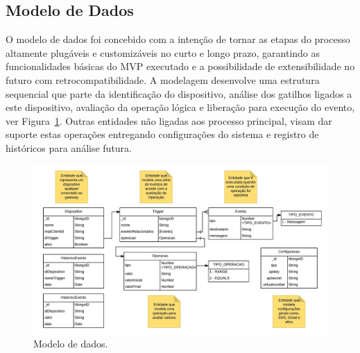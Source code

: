 \subsection{Modelo de Dados} 
O modelo de dados foi concebido com a intenção de tornar as etapas do processo altamente plugáveis e customizáveis no curto e longo prazo, garantindo as funcionalidades básicas do MVP executado e a possibilidade de extensibilidade no futuro com retrocompatibilidade.
A modelagem desenvolve uma estrutura sequencial que parte da identificação do dispositivo, análise dos gatilhos ligados a este dispositivo, avaliação da operação lógica e liberação para execução do evento, ver Figura~\ref{fig:modeloDeDados}. Outras entidades não ligadas aos processo principal, visam dar suporte estas operações entregando configurações do sistema e registro de históricos para análise futura. 

\begin{figure}[h!]
	\begin{center}
		\includegraphics[width=1\textwidth]{./img/modelo-de-dados}
		\caption{Modelo de dados.}
		\label{fig:modeloDeDados}
	\end{center}
\end{figure}
